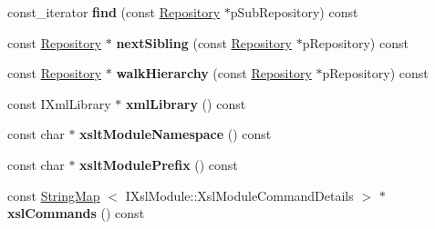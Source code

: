\begin{DoxyCompactItemize}
\item 
\hypertarget{classgeneral__server_1_1Repository_af87087285cbc2855c8aec97a6b2a2f8f}{const\-\_\-iterator {\bfseries find} (const \hyperlink{classgeneral__server_1_1Repository}{\-Repository} $\ast$p\-Sub\-Repository) const }\label{classgeneral__server_1_1Repository_af87087285cbc2855c8aec97a6b2a2f8f}

\item 
\hypertarget{classgeneral__server_1_1Repository_ae6653e6512c670947f287c2449f12de9}{const \hyperlink{classgeneral__server_1_1Repository}{\-Repository} $\ast$ {\bfseries next\-Sibling} (const \hyperlink{classgeneral__server_1_1Repository}{\-Repository} $\ast$p\-Repository) const }\label{classgeneral__server_1_1Repository_ae6653e6512c670947f287c2449f12de9}

\item 
\hypertarget{classgeneral__server_1_1Repository_a7590c019ef21a2d04afcd038508b89d8}{const \hyperlink{classgeneral__server_1_1Repository}{\-Repository} $\ast$ {\bfseries walk\-Hierarchy} (const \hyperlink{classgeneral__server_1_1Repository}{\-Repository} $\ast$p\-Repository) const }\label{classgeneral__server_1_1Repository_a7590c019ef21a2d04afcd038508b89d8}

\item 
\hypertarget{classgeneral__server_1_1Repository_aea65e722f62347a36d2dac92eb366061}{const \-I\-Xml\-Library $\ast$ {\bfseries xml\-Library} () const }\label{classgeneral__server_1_1Repository_aea65e722f62347a36d2dac92eb366061}

\item 
\hypertarget{classgeneral__server_1_1Repository_a4c7627605e305211ba85d6131cf55d61}{const char $\ast$ {\bfseries xslt\-Module\-Namespace} () const }\label{classgeneral__server_1_1Repository_a4c7627605e305211ba85d6131cf55d61}

\item 
\hypertarget{classgeneral__server_1_1Repository_a9cea0b1e66b51ded0c25680857e8396a}{const char $\ast$ {\bfseries xslt\-Module\-Prefix} () const }\label{classgeneral__server_1_1Repository_a9cea0b1e66b51ded0c25680857e8396a}

\item 
\hypertarget{classgeneral__server_1_1Repository_aa612159371d310b56cd34c985f4d6f73}{const \hyperlink{classgeneral__server_1_1StringMap}{\-String\-Map}\*
$<$ \-I\-Xsl\-Module\-::\-Xsl\-Module\-Command\-Details $>$ $\ast$ {\bfseries xsl\-Commands} () const }\label{classgeneral__server_1_1Repository_aa612159371d310b56cd34c985f4d6f73}


\end{DoxyCompactItemize}
